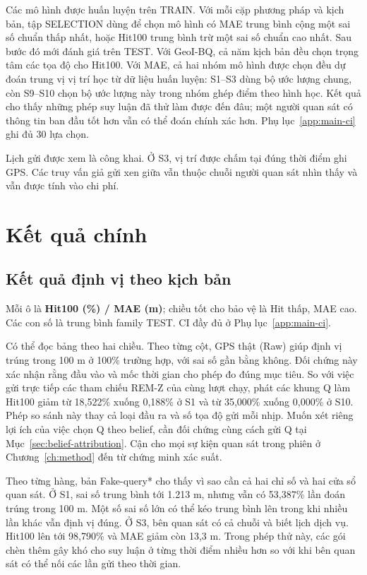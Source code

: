 Các mô hình được huấn luyện trên TRAIN. Với mỗi cặp phương pháp và kịch bản, tập SELECTION dùng để chọn mô hình có MAE trung bình cộng một sai số chuẩn thấp nhất, hoặc Hit100 trung bình trừ một sai số chuẩn cao nhất. Sau bước đó mới đánh giá trên TEST. Với GeoI-BQ, cả năm kịch bản đều chọn trọng tâm các tọa độ cho Hit100. Với MAE, cả hai nhóm mô hình được chọn đều dự đoán trung vị vị trí học từ dữ liệu huấn luyện: S1--S3 dùng bộ ước lượng chung, còn S9--S10 chọn bộ ước lượng này trong nhóm ghép điểm theo hình học. Kết quả cho thấy những phép suy luận đã thử làm được đến đâu; một người quan sát có thông tin ban đầu tốt hơn vẫn có thể đoán chính xác hơn. Phụ lục~\ref{app:main-ci} ghi đủ 30 lựa chọn.

Lịch gửi được xem là công khai. Ở S3, vị trí được chấm tại đúng thời điểm ghi GPS. Các truy vấn giả gửi xen giữa vẫn thuộc chuỗi người quan sát nhìn thấy và vẫn được tính vào chi phí.

\section{Kết quả chính}
\subsection{Kết quả định vị theo kịch bản}\label{sec:main-privacy}
Mỗi ô là \textbf{Hit100 (\%) / MAE (m)}; chiều tốt cho bảo vệ là Hit thấp, MAE cao.
Các con số là trung bình family TEST. CI đầy đủ ở Phụ lục~\ref{app:main-ci}.
\begin{small}\end{small}

Có thể đọc bảng theo hai chiều. Theo từng cột, GPS thật (Raw) giúp định vị trúng trong
100 m ở 100\% trường hợp, với sai số gần bằng không. Đối chứng này xác nhận rằng đầu vào và
mốc thời gian cho phép đo đúng mục tiêu. So với việc gửi trực tiếp các tham chiếu REM-Z của cùng lượt chạy, phát các khung Q làm
Hit100 giảm từ 18,522\% xuống 0,188\% ở S1 và từ 35,000\% xuống 0,000\% ở S10.
Phép so sánh này thay cả loại đầu ra và số tọa độ gửi mỗi nhịp. Muốn xét riêng lợi ích
của việc chọn Q theo belief, cần đối chứng cùng cách gửi Q tại Mục~\ref{sec:belief-attribution}.
Cận cho mọi sự kiện quan sát trong phiên ở Chương~\ref{ch:method} đến từ chứng minh xác suất.

Theo từng hàng, bản Fake-query* cho thấy vì sao cần cả hai chỉ số và hai cửa sổ quan sát.
Ở S1, sai số trung bình tới 1.213 m, nhưng vẫn có 53,387\% lần đoán trúng trong 100 m.
Một số sai số lớn có thể kéo trung bình lên trong khi nhiều lần khác vẫn định vị đúng.
Ở S3, bên quan sát có cả chuỗi và biết lịch dịch vụ. Hit100 lên tới 98,790\% và MAE giảm
còn 13,3 m. Trong phép thử này, các gói chèn thêm gây khó cho suy luận ở từng thời điểm
nhiều hơn so với khi bên quan sát có thể nối các lần gửi theo thời gian.

